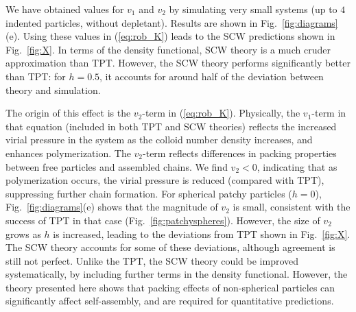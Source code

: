 \documentclass[8.5pt,oneside,onecolumn]{article}
\begin{document}
We have obtained values for $v_1$ and $v_2$ by simulating very small systems (up to $4$ 
indented particles, without depletant).  Results are shown in Fig.~\ref{fig:diagrams}(e).  Using these
values in (\ref{eq:rob_K}) leads to the SCW predictions shown in Fig.~\ref{fig:X}.  In terms of the density functional,
SCW theory 
is a much cruder approximation than TPT.  However,
the SCW theory performs significantly better than TPT: for $h=0.5$, it accounts for around half of the deviation between theory
and simulation.  

The  origin of this effect is the $v_2$-term in (\ref{eq:rob_K}). Physically, the $v_1$-term in that equation 
(included in both TPT and SCW theories)
reflects the increased virial pressure in the system as the colloid number
density increases, and enhances polymerization.  
The $v_2$-term reflects differences in packing properties between free particles and assembled chains.  
We find $v_2<0$, indicating that as polymerization occurs, the virial pressure is reduced (compared with TPT), suppressing further chain formation.
For spherical patchy particles ($h=0$), 
Fig.~\ref{fig:diagrams}(e) shows that the magnitude of $v_2$ is small, consistent with the success of TPT in that case (Fig.~\ref{fig:patchyspheres}).
However, the size of $v_2$ grows as $h$ is increased, leading to the deviations from TPT shown in Fig.~\ref{fig:X}.  The
SCW theory accounts for some of these deviations, although agreement is still not perfect.  Unlike the TPT, the 
SCW theory could be improved systematically, 
by including further terms in the density functional.  However, the theory presented here shows 
that packing effects of non-spherical particles can significantly affect self-assembly, and are required for quantitative
predictions.
\end{document}
